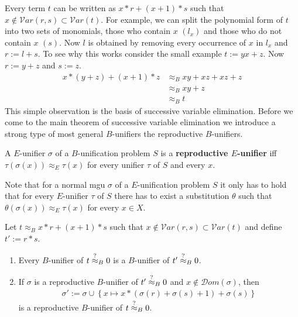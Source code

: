 		Every term $t$ can be written as $x*r+(x+1)*s$ such that $x\notin\mathcal{V}ar(r,s)\subset\mathcal{V}ar(t)$. For example, we can split the polynomial form of $t$ into two sets of monomials, those who contain $x$  $\left(l_x\right)$ and those who do not contain $x$ $(s)$. Now $l$ is obtained by removing every occurrence of $x$ in $l_x$ and $r:=l+s$. To see why this works consider the small example $t:=yx+z$. Now $r:=y+z$ and $s:=z$.
		\begin{align*}
		x*(y+z)+(x+1)*z&\approx_B xy+xz+xz+z\\
		&\approx_B xy+z\\
		&\approx_B t
		\end{align*}
		This simple observation is the basis of successive variable elimination.
		Before we come to the main theorem of successive variable elimination we introduce a strong type of most general $B$-unifiers the reproductive $B$-unifiers.
		\begin{definition}
		A $E$-unifier $\sigma$ of a $B$-unification problem $S$ is a \textbf{reproductive $E$-unifier} iff $\tau(\sigma(x))\approx_E\tau(x)$ for every unifier $\tau$ of $S$ and every $x$.
		\end{definition}
		Note that for a normal mgu $\sigma$ of a $E$-unification problem $S$ it only has to hold that for every $E$-unifier $\tau$ of $S$ there has to exist a substitution $\theta$ such that $\theta(\sigma(x))\approx_E\tau(x)$ for every $x\in X$. 
		\begin{theorem}\label{sucVEli}
		Let $t\approx_B x*r+(x+1)*s$ such that $x\notin\mathcal{V}ar(r,s)\subset\mathcal{V}ar(t)$ and define $t':=r*s$.
		\begin{enumerate}
		\item Every $B$-unifier of $t\stackrel{?}{\approx}_B0$ is a $B$-unifier of $t'\stackrel{?}{\approx}_B0$.
		\item If $\sigma$ is a reproductive $B$-unifier of $t'\stackrel{?}{\approx}_B0$ and $x\notin\mathcal{D}om(\sigma)$, then 
		\begin{align*}
		\sigma':=\sigma\cup\left\lbrace x\mapsto x*(\sigma(r)+\sigma(s)+1)+\sigma(s)\right\rbrace
		\end{align*}
		is a reproductive $B$-unifier of $t\stackrel{?}{\approx}_B0$.
		\end{enumerate}
		\end{theorem}
